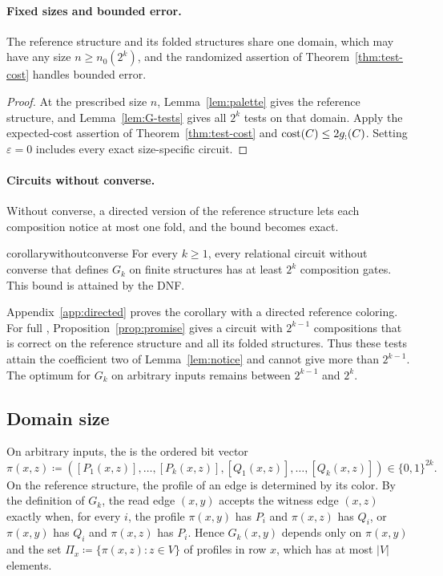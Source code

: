 \paragraph{Fixed sizes and bounded error.}
The reference structure and its folded structures share one domain,
which may have any size $n\ge n_0(2^k)$, and the randomized assertion of
Theorem~\ref{thm:test-cost} handles bounded error.
\randomizedbounds*
\begin{proof}
At the prescribed size $n$, Lemma~\ref{lem:palette} gives the reference
structure, and Lemma~\ref{lem:G-tests} gives all $2^k$ tests on that domain.
Apply the expected-cost assertion of Theorem~\ref{thm:test-cost} and
$\operatorname{cost}(C)\le2g_{;}(C)$. Setting $\varepsilon=0$ includes every exact
size-specific circuit.
\end{proof}

\paragraph{Circuits without converse.}
Without converse, a directed version of the reference structure lets
each composition notice at most one fold, and the bound becomes exact.
\begin{restatable}{corollary}{withoutconverse}\label{cor:without-converse}
For every $k\ge1$, every relational circuit without converse that
defines $G_k$ on finite structures has at least $2^k$ composition gates.
This bound is attained by the DNF.
\end{restatable}
Appendix~\ref{app:directed} proves the corollary with a directed
reference coloring. For full \CoR, Proposition~\ref{prop:promise} gives
a circuit with $2^{k-1}$ compositions that is correct on the reference
structure and all its folded structures. Thus these tests attain the
coefficient two of Lemma~\ref{lem:notice} and cannot give more than
$2^{k-1}$. The optimum for $G_k$ on arbitrary inputs remains between
$2^{k-1}$ and $2^k$.

\subsection{Domain size}\label{sec:domain-size}
On arbitrary inputs, the  is the ordered bit vector
\[
 \pi(x,z)\coloneqq
 ([P_1(x,z)],\ldots,[P_k(x,z)],
  [Q_1(x,z)],\ldots,[Q_k(x,z)])\in\{0,1\}^{2k}.
\]
On the reference structure, the profile of an edge is determined by its color.
By the definition of $G_k$,
the read edge $(x,y)$ accepts the witness edge $(x,z)$ exactly when, for
every $i$, the profile $\pi(x,y)$ has $P_i$ and $\pi(x,z)$ has $Q_i$, or
$\pi(x,y)$ has $Q_i$ and $\pi(x,z)$ has $P_i$. Hence $G_k(x,y)$ depends
only on $\pi(x,y)$ and the set $\Pi_x\coloneqq\{\pi(x,z):z\in V\}$ of profiles in
row $x$, which has at most $|V|$ elements.

